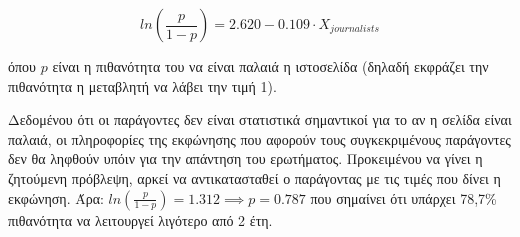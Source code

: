 \documentclass{assignment}
\begin{document}
\begin{Assignment}[Μέρος Ε]
\begin{equation}
ln(\frac{p}{1-p}) = 2.620 -0.109 \cdot X_{journalists}
\end{equation}

όπου $p$ είναι η πιθανότητα του να είναι παλαιά η ιστοσελίδα (δηλαδή εκφράζει την πιθανότητα η μεταβλητή να λάβει την τιμή 1).


Δεδομένου ότι οι παράγοντες  δεν είναι στατιστικά σημαντικοί για το αν η σελίδα είναι παλαιά, οι πληροφορίες της εκφώνησης που αφορούν τους συγκεκριμένους παράγοντες δεν θα ληφθούν υπόιν για την απάντηση του ερωτήματος. Προκειμένου να γίνει η ζητούμενη πρόβλεψη, αρκεί να αντικατασταθεί ο παράγοντας  με τις τιμές που δίνει η εκφώνηση. Άρα:
$ln(\frac{p}{1-p}) = 1.312 \implies p = 0.787$ που σημαίνει ότι υπάρχει 78,7\% πιθανότητα να λειτουργεί λιγότερο από 2 έτη.

\end{Assignment}


 \label{Βιβλιογραφία}



\newpage
\end{document}
